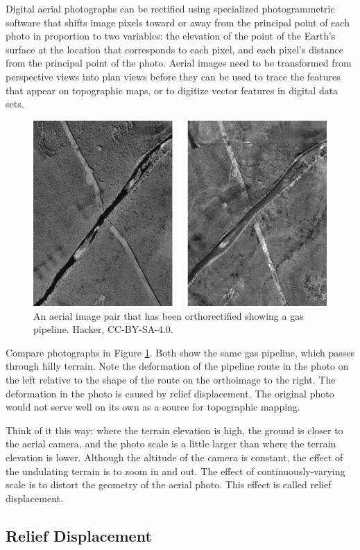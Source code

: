 \documentclass[
]{book}
\begin{document}
Digital aerial photographs can be rectified using specialized photogrammetric software that shifts image pixels toward or away from the principal point of each photo in proportion to two variables: the elevation of the point of the Earth's surface at the location that corresponds to each pixel, and each pixel's distance from the principal point of the photo. Aerial images need to be transformed from perspective views into plan views before they can be used to trace the features that appear on topographic maps, or to digitize vector features in digital data sets.

\begin{figure}
\includegraphics[width=0.75\linewidth]{images/13-orthorectification} \caption{An aerial image pair that has been orthorectified showing a gas pipeline. Hacker, CC-BY-SA-4.0.}\label{fig:13-orthorectification}
\end{figure}

Compare photographs in Figure \ref{fig:13-orthorectification}. Both show the same gas pipeline, which passes through hilly terrain. Note the deformation of the pipeline route in the photo on the left relative to the shape of the route on the orthoimage to the right. The deformation in the photo is caused by relief displacement. The original photo would not serve well on its own as a source for topographic mapping.

Think of it this way: where the terrain elevation is high, the ground is closer to the aerial camera, and the photo scale is a little larger than where the terrain elevation is lower. Although the altitude of the camera is constant, the effect of the undulating terrain is to zoom in and out. The effect of continuously-varying scale is to distort the geometry of the aerial photo. This effect is called relief displacement.

\subsection{Relief Displacement}\label{relief-displacement}
\end{document}
